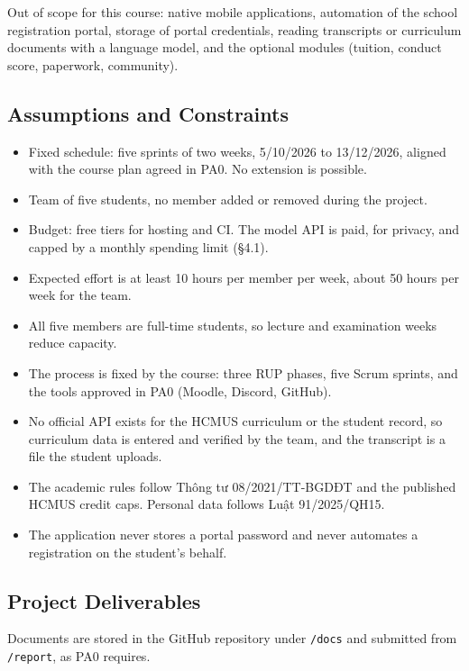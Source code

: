 \documentclass{article}
\newcommand{\chg}[1]{\textcolor{chg}{#1}}
\begin{document}
Out of scope for this course: native mobile applications, automation of the school registration portal, storage of portal
credentials, \chg{reading transcripts or curriculum documents with a language model,} and the optional modules (tuition,
conduct score, paperwork, community).

\subsection{Assumptions and Constraints}
\begin{itemize}
  \item Fixed schedule: five sprints of two weeks, 5/10/2026 to 13/12/2026, aligned with the course plan agreed in PA0.
        No extension is possible.
  \item Team of five students, no member added or removed during the project.
  \item \chg{Budget: free tiers for hosting and CI. The model API is paid, for privacy, and capped by a monthly spending
        limit (§4.1).}
  \item Expected effort is at least 10 hours per member per week, about 50 hours per week for the team.
  \item All five members are full-time students, so lecture and examination weeks reduce capacity.
  \item The process is fixed by the course: three RUP phases, five Scrum sprints, and the tools approved in PA0 (Moodle,
        Discord, GitHub).
  \item No official API exists for the HCMUS curriculum or the student record, so curriculum data is entered and verified
        by the team, and the transcript is a file the student uploads.
  \item The academic rules follow Thông tư 08/2021/TT-BGDĐT and the published HCMUS credit caps. Personal data follows
        Luật 91/2025/QH15.
  \item The application never stores a portal password and never automates a registration on the student's behalf.
\end{itemize}

\subsection{Project Deliverables}
Documents are stored in the GitHub repository under \texttt{/docs} and submitted from \chg{\texttt{/report}}, as PA0
requires.
\end{document}
